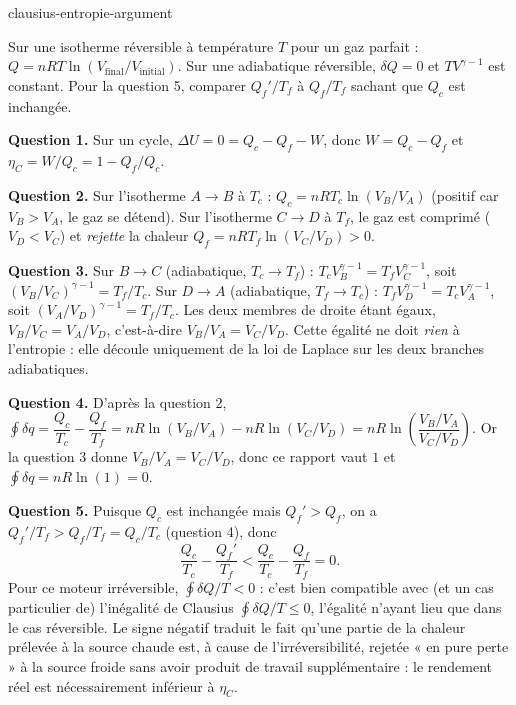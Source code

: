 \begin{exo}{clausius-entropie-argument}
\begin{indication}
Sur une isotherme réversible à température $T$ pour un gaz parfait : $Q = nRT\ln(V_{\text{final}}/V_{\text{initial}})$. Sur une adiabatique réversible, $\delta Q = 0$ et $TV^{\gamma - 1}$ est constant. Pour la question 5, comparer $Q_f'/T_f$ à $Q_f/T_f$ sachant que $Q_c$ est inchangée.
\end{indication}

\begin{solution}
\textbf{Question 1.} Sur un cycle, $\Delta U = 0 = Q_c - Q_f - W$, donc $W = Q_c - Q_f$ et $\eta_C = W/Q_c = 1 - Q_f/Q_c$.

\textbf{Question 2.} Sur l'isotherme $A \to B$ à $T_c$ : $Q_c = nRT_c \ln(V_B/V_A)$ (positif car $V_B > V_A$, le gaz se détend). Sur l'isotherme $C \to D$ à $T_f$, le gaz est comprimé ($V_D < V_C$) et \emph{rejette} la chaleur $Q_f = nRT_f \ln(V_C/V_D) > 0$.

\textbf{Question 3.} Sur $B \to C$ (adiabatique, $T_c \to T_f$) : $T_c V_B^{\gamma-1} = T_f V_C^{\gamma-1}$, soit $(V_B/V_C)^{\gamma - 1} = T_f/T_c$. Sur $D \to A$ (adiabatique, $T_f \to T_c$) : $T_f V_D^{\gamma - 1} = T_c V_A^{\gamma-1}$, soit $(V_A/V_D)^{\gamma-1} = T_f/T_c$. Les deux membres de droite étant égaux, $V_B/V_C = V_A/V_D$, c'est-à-dire $V_B/V_A = V_C/V_D$. Cette égalité ne doit \emph{rien} à l'entropie : elle découle uniquement de la loi de Laplace sur les deux branches adiabatiques.

\textbf{Question 4.} D'après la question 2, $\oint \delta q = \dfrac{Q_c}{T_c} - \dfrac{Q_f}{T_f} = nR\ln(V_B/V_A) - nR\ln(V_C/V_D) = nR\ln\!\left(\dfrac{V_B/V_A}{V_C/V_D}\right)$. Or la question 3 donne $V_B/V_A = V_C/V_D$, donc ce rapport vaut $1$ et $\oint \delta q = nR \ln(1) = 0$.

\textbf{Question 5.} Puisque $Q_c$ est inchangée mais $Q_f' > Q_f$, on a $Q_f'/T_f > Q_f/T_f = Q_c/T_c$ (question 4), donc
\[
\frac{Q_c}{T_c} - \frac{Q_f'}{T_f} < \frac{Q_c}{T_c} - \frac{Q_f}{T_f} = 0.
\]
Pour ce moteur irréversible, $\oint \delta Q/T < 0$ : c'est bien compatible avec (et un cas particulier de) l'inégalité de Clausius $\oint \delta Q/T \leq 0$, l'égalité n'ayant lieu que dans le cas réversible. Le signe négatif traduit le fait qu'une partie de la chaleur prélevée à la source chaude est, à cause de l'irréversibilité, rejetée « en pure perte » à la source froide sans avoir produit de travail supplémentaire : le rendement réel est nécessairement inférieur à $\eta_C$.


\end{solution}
\end{exo}
